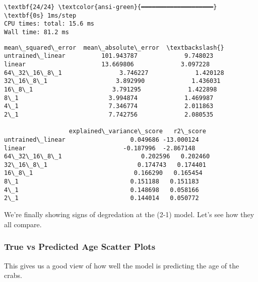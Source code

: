 \documentclass[11pt]{article}
\makeatletter
\newcommand{\boxspacing}{\kern\kvtcb@left@rule\kern\kvtcb@boxsep}
\newcommand{\prompt}[4]{
        {\ttfamily\llap{{\color{#2}[#3]:\hspace{3pt}#4}}\vspace{-\baselineskip}}
    }
\makeatother
\begin{document}
    \begin{Verbatim}[commandchars=\\\{\}]
\textbf{24/24} \textcolor{ansi-green}{━━━━━━━━━━━━━━━━━━━━} \textbf{0s} 1ms/step
CPU times: total: 15.6 ms
Wall time: 81.2 ms
    \end{Verbatim}

            \begin{tcolorbox}[breakable, size=fbox, boxrule=.5pt, pad at break*=1mm, opacityfill=0]
\prompt{Out}{outcolor}{32}{\boxspacing}
\begin{Verbatim}[commandchars=\\\{\}]
                  mean\_squared\_error  mean\_absolute\_error  \textbackslash{}
untrained\_linear          101.943787             9.748023
linear                     13.669806             3.097228
64\_32\_16\_8\_1                3.746227             1.420128
32\_16\_8\_1                   3.892990             1.436031
16\_8\_1                      3.791295             1.422898
8\_1                         3.994874             1.469987
4\_1                         7.346774             2.011863
2\_1                         7.742756             2.080535

                  explained\_variance\_score   r2\_score
untrained\_linear                  0.049686 -13.000124
linear                           -0.187996  -2.867148
64\_32\_16\_8\_1                      0.202596   0.202460
32\_16\_8\_1                         0.174743   0.174401
16\_8\_1                            0.166290   0.165454
8\_1                               0.151188   0.151183
4\_1                               0.148698   0.058166
2\_1                               0.144014   0.050772
\end{Verbatim}
\end{tcolorbox}
        
    We're finally showing signs of degredation at the (2-1) model. Let's see
how they all compare.

    \subsubsection{True vs Predicted Age Scatter
Plots}\label{true-vs-predicted-age-scatter-plots}

This gives us a good view of how well the model is predicting the age of
the crabs.
\end{document}
